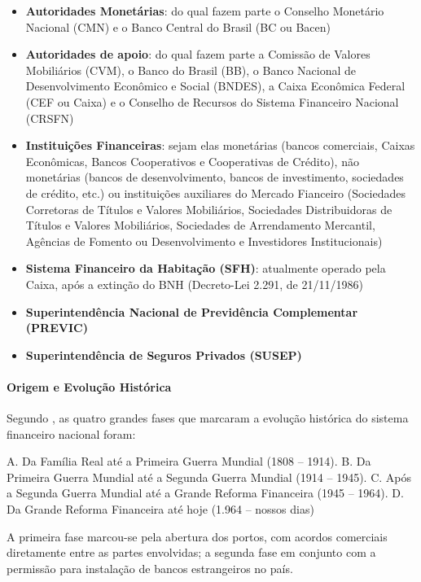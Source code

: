 \documentclass[]{article}
\providecommand{\tightlist}{%
  \setlength{\itemsep}{0pt}\setlength{\parskip}{0pt}}
\let\oldparagraph\paragraph
\renewcommand{\paragraph}[1]{\oldparagraph{#1}\mbox{}}
\begin{document}
\begin{itemize}
\tightlist
\item
  \textbf{Autoridades Monetárias}: do qual fazem parte o Conselho
  Monetário Nacional (CMN) e o Banco Central do Brasil (BC ou Bacen)
\item
  \textbf{Autoridades de apoio}: do qual fazem parte a Comissão de
  Valores Mobiliários (CVM), o Banco do Brasil (BB), o Banco Nacional de
  Desenvolvimento Econômico e Social (BNDES), a Caixa Econômica Federal
  (CEF ou Caixa) e o Conselho de Recursos do Sistema Financeiro Nacional
  (CRSFN)
\item
  \textbf{Instituições Financeiras}: sejam elas monetárias (bancos
  comerciais, Caixas Econômicas, Bancos Cooperativos e Cooperativas de
  Crédito), não monetárias (bancos de desenvolvimento, bancos de
  investimento, sociedades de crédito, etc.) ou instituições auxiliares
  do Mercado Fianceiro (Sociedades Corretoras de Títulos e Valores
  Mobiliários, Sociedades Distribuidoras de Títulos e Valores
  Mobiliários, Sociedades de Arrendamento Mercantil, Agências de Fomento
  ou Desenvolvimento e Investidores Institucionais)
\item
  \textbf{Sistema Financeiro da Habitação (SFH)}: atualmente operado
  pela Caixa, após a extinção do BNH (Decreto-Lei 2.291, de 21/11/1986)
\item
  \textbf{Superintendência Nacional de Previdência Complementar
  (PREVIC)}
\item
  \textbf{Superintendência de Seguros Privados (SUSEP)}
\end{itemize}

\paragraph{Origem e Evolução
Histórica}\label{origem-e-evolucao-historica}

Segundo , as quatro grandes
fases que marcaram a evolução histórica do sistema financeiro nacional
foram:

A. Da Família Real até a Primeira Guerra Mundial (1808 -- 1914). B. Da
Primeira Guerra Mundial até a Segunda Guerra Mundial (1914 -- 1945). C.
Após a Segunda Guerra Mundial até a Grande Reforma Financeira (1945 --
1964). D. Da Grande Reforma Financeira até hoje (1.964 -- nossos dias)

A primeira fase marcou-se pela abertura dos portos, com acordos
comerciais diretamente entre as partes envolvidas; a segunda fase em
conjunto com a permissão para instalação de bancos estrangeiros no
país.\cite[p.~12]{beatrizselan}
\end{document}
